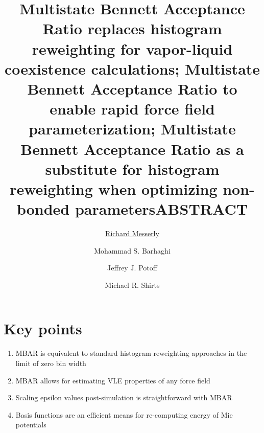 \documentclass[11pt,a4paper]{article}
\begin{document}
	\thispagestyle{empty}
	\title{\Large \textbf{Multistate Bennett Acceptance Ratio replaces histogram reweighting for vapor-liquid coexistence calculations; Multistate Bennett Acceptance Ratio to enable rapid force field parameterization; Multistate Bennett Acceptance Ratio as a substitute for histogram reweighting when optimizing non-bonded parameters}}
	\author[1]{\large {\underline{Richard Messerly}}}%
	
		
	\author[2]{Mohammad S. Barhaghi}
	
	\author[2]{Jeffrey J. Potoff}
	
	\author[3]{Michael R. Shirts}
	
	\date{} %
	\maketitle\thispagestyle{empty} %
	\begin{center}
		\title{\textbf{ABSTRACT}}\centering{}
	\end{center}
	\justify
	
\section*{Key points}

\begin{enumerate}
	\item MBAR is equivalent to standard histogram reweighting approaches in the limit of zero bin width
	\item MBAR allows for estimating VLE properties of any force field
	\item Scaling epsilon values post-simulation is straightforward with MBAR
	\item Basis functions are an efficient means for re-computing energy of Mie potentials
\end{enumerate}
\end{document}
